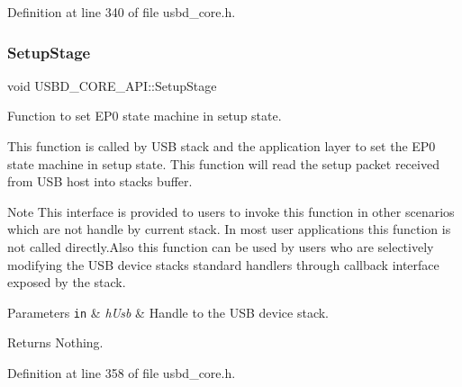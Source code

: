 Definition at line 340 of file usbd\+\_\+core.\+h.

\mbox{\label{struct_u_s_b_d___c_o_r_e___a_p_i_abf9196752dcf110a13c44a14b368e4be}} 
\subsubsection{\texorpdfstring{Setup\+Stage}{SetupStage}}
{\footnotesize\ttfamily void U\+S\+B\+D\+\_\+\+C\+O\+R\+E\+\_\+\+A\+P\+I\+::\+Setup\+Stage}

Function to set E\+P0 state machine in setup state.

This function is called by U\+SB stack and the application layer to set the E\+P0 state machine in setup state. This function will read the setup packet received from U\+SB host into stack\textquotesingle{}s buffer. ~\newline
\begin{DoxyNote}{Note}
This interface is provided to users to invoke this function in other scenarios which are not handle by current stack. In most user applications this function is not called directly.\+Also this function can be used by users who are selectively modifying the U\+SB device stack\textquotesingle{}s standard handlers through callback interface exposed by the stack.
\end{DoxyNote}

\begin{DoxyParams}[1]{Parameters}
\mbox{\tt in}  & {\em h\+Usb} & Handle to the U\+SB device stack. \\
\hline
\end{DoxyParams}
\begin{DoxyReturn}{Returns}
Nothing. 
\end{DoxyReturn}


Definition at line 358 of file usbd\+\_\+core.\+h.

\mbox{\label{struct_u_s_b_d___c_o_r_e___a_p_i_a8ee40b044bb1327607dbb4185b2b7c93}} 

